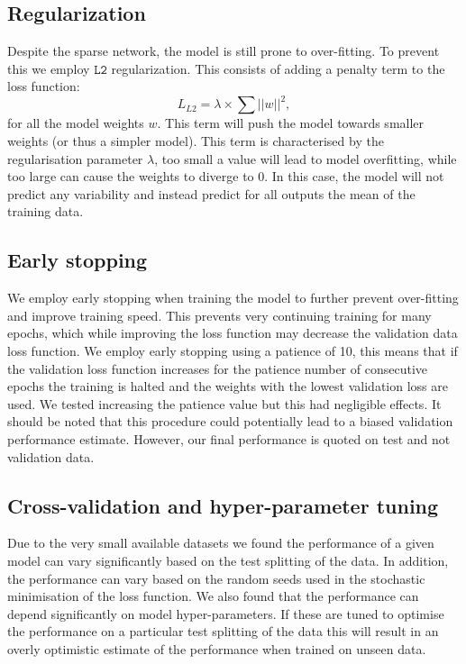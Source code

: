 \documentclass[NOTE, disdraft=true, UKenglish]{\DISCDTLATEXPATH UCLCDTDISdoc}
\begin{document}
\subsection{Regularization}
Despite the sparse network, the model is still prone to over-fitting. To prevent this we employ $\mathtt{L2}$ regularization. This consists of adding a penalty term to the loss function:
\begin{equation}
    L_{L2} = \lambda \times \sum ||w||^2,
\end{equation}
for all the model weights $w$. This term will push the model towards smaller weights (or thus a simpler model). This term is characterised by the regularisation parameter $\lambda$, too small a value will lead to model overfitting, while too large can cause the weights to diverge to 0. In this case, the model will not predict any variability and instead predict for all outputs the mean of the training data.
\subsection{Early stopping}
We employ early stopping \cite{keras-docs} when training the model to further prevent over-fitting and improve training speed. This prevents very continuing training for many epochs, which while improving the loss function may decrease the validation data loss function. We employ early stopping using a patience of 10, this means that if the validation loss function increases for the patience number of consecutive epochs the training is halted and the weights with the lowest validation loss are used. We tested increasing the patience value but this had negligible effects.
It should be noted that this procedure could potentially lead to a biased validation performance estimate. However, our final performance is quoted on test and not validation data.

\subsection{Cross-validation and hyper-parameter tuning}
Due to the very small available datasets we found the performance of a given model can vary significantly based on the test splitting of the data. In addition, the performance can vary based on the random seeds used in the stochastic minimisation of the loss function. We also found that the performance can depend significantly on model hyper-parameters. If these are tuned to optimise the performance on a particular test splitting of the data this will result in an overly optimistic estimate of the performance when trained on unseen data.
\end{document}
